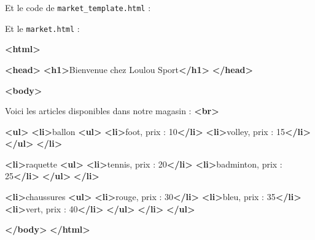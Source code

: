 \documentclass[11pt]{article}
\newenvironment{Shaded}{}{}
\newcommand{\KeywordTok}[1]{\textcolor[rgb]{0.00,0.44,0.13}{\textbf{{#1}}}}
\newcommand{\NormalTok}[1]{{#1}}
\begin{document}
Et le code de \texttt{market\_template.html} :

\begin{Shaded}
\end{Shaded}

Et le \texttt{market.html} :

\begin{Shaded}
\begin{Highlighting}[]
\KeywordTok{<html>}

\KeywordTok{<head>}
\KeywordTok{<h1>}\NormalTok{Bienvenue chez Loulou Sport}\KeywordTok{</h1>}
\KeywordTok{</head>}

\KeywordTok{<body>}

\NormalTok{Voici les articles disponibles dans notre magasin : }\KeywordTok{<br>}

\KeywordTok{<ul>}
    \KeywordTok{<li>}\NormalTok{ballon}
        \KeywordTok{<ul>}
            \KeywordTok{<li>}\NormalTok{foot, prix : 10}\KeywordTok{</li>}
            \KeywordTok{<li>}\NormalTok{volley, prix : 15}\KeywordTok{</li>}
        \KeywordTok{</ul>}
    \KeywordTok{</li>}

    \KeywordTok{<li>}\NormalTok{raquette}
        \KeywordTok{<ul>}
            \KeywordTok{<li>}\NormalTok{tennis, prix : 20}\KeywordTok{</li>}
            \KeywordTok{<li>}\NormalTok{badminton, prix : 25}\KeywordTok{</li>}
        \KeywordTok{</ul>}
    \KeywordTok{</li>}

    \KeywordTok{<li>}\NormalTok{chaussures}
        \KeywordTok{<ul>}
            \KeywordTok{<li>}\NormalTok{rouge, prix : 30}\KeywordTok{</li>}
            \KeywordTok{<li>}\NormalTok{bleu, prix : 35}\KeywordTok{</li>}
            \KeywordTok{<li>}\NormalTok{vert, prix : 40}\KeywordTok{</li>}
        \KeywordTok{</ul>}
    \KeywordTok{</li>}
\KeywordTok{</ul>}

\KeywordTok{</body>}
\KeywordTok{</html>}
\end{Highlighting}
\end{Shaded}
\end{document}

